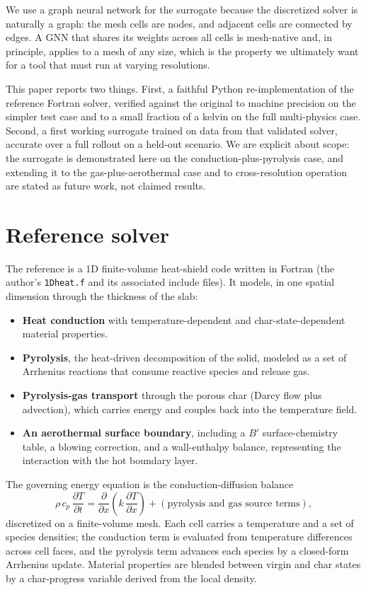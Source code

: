 \documentclass[11pt]{article}
\begin{document}
We use a graph neural network for the surrogate because the discretized solver is
naturally a graph: the mesh cells are nodes, and adjacent cells are connected by
edges. A GNN that shares its weights across all cells is mesh-native and, in
principle, applies to a mesh of any size, which is the property we ultimately want
for a tool that must run at varying resolutions.

This paper reports two things. First, a faithful Python re-implementation of the
reference Fortran solver, verified against the original to machine precision on
the simpler test case and to a small fraction of a kelvin on the full
multi-physics case. Second, a first working surrogate trained on data from that
validated solver, accurate over a full rollout on a held-out scenario. We are
explicit about scope: the surrogate is demonstrated here on the
conduction-plus-pyrolysis case, and extending it to the gas-plus-aerothermal case
and to cross-resolution operation are stated as future work, not claimed results.

\section{Reference solver}

The reference is a 1D finite-volume heat-shield code written in Fortran (the
author's \texttt{1Dheat.f} and its associated include files). It models, in one
spatial dimension through the thickness of the slab:

\begin{itemize}
  \item \textbf{Heat conduction} with temperature-dependent and
  char-state-dependent material properties.
  \item \textbf{Pyrolysis}, the heat-driven decomposition of the solid, modeled as
  a set of Arrhenius reactions that consume reactive species and release gas.
  \item \textbf{Pyrolysis-gas transport} through the porous char (Darcy flow plus
  advection), which carries energy and couples back into the temperature field.
  \item \textbf{An aerothermal surface boundary}, including a $B'$
  surface-chemistry table, a blowing correction, and a wall-enthalpy balance,
  representing the interaction with the hot boundary layer.
\end{itemize}

The governing energy equation is the conduction-diffusion balance
\begin{equation}
\rho\, c_p\, \frac{\partial T}{\partial t}
  = \frac{\partial}{\partial x}\!\left(k\, \frac{\partial T}{\partial x}\right)
  + (\text{pyrolysis and gas source terms}),
\end{equation}
discretized on a finite-volume mesh. Each cell carries a temperature and a set of
species densities; the conduction term is evaluated from temperature differences
across cell faces, and the pyrolysis term advances each species by a closed-form
Arrhenius update. Material properties are blended between virgin and char states by
a char-progress variable derived from the local density.
\end{document}
